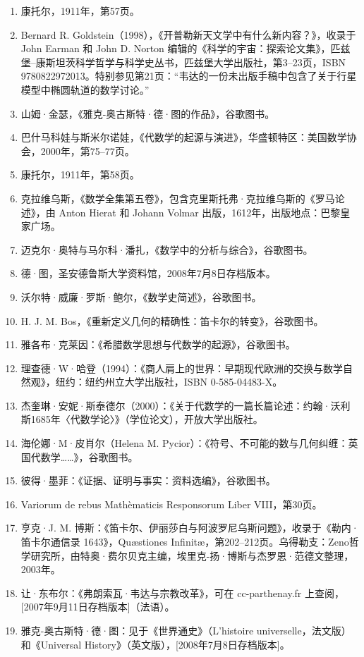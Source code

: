 \begin{enumerate}
\item 康托尔，1911年，第57页。
\item Bernard R. Goldstein（1998），《开普勒新天文学中有什么新内容？》，收录于 John Earman 和 John D. Norton 编辑的《科学的宇宙：探索论文集》，匹兹堡–康斯坦茨科学哲学与科学史丛书，匹兹堡大学出版社，第3–23页，ISBN 9780822972013。特别参见第21页：“韦达的一份未出版手稿中包含了关于行星模型中椭圆轨道的数学讨论。”
\item 山姆·金瑟，《雅克-奥古斯特·德·图的作品》，谷歌图书。
\item 巴什马科娃与斯米尔诺娃，《代数学的起源与演进》，华盛顿特区：美国数学协会，2000年，第75–77页。
\item 康托尔，1911年，第58页。
\item 克拉维乌斯，《数学全集第五卷》，包含克里斯托弗·克拉维乌斯的《罗马论述》，由 Anton Hierat 和 Johann Volmar 出版，1612年，出版地点：巴黎皇家广场。
\item 迈克尔·奥特与马尔科·潘扎，《数学中的分析与综合》，谷歌图书。
\item 德·图，圣安德鲁斯大学资料馆，2008年7月8日存档版本。
\item 沃尔特·威廉·罗斯·鲍尔，《数学史简述》，谷歌图书。
\item H. J. M. Bos，《重新定义几何的精确性：笛卡尔的转变》，谷歌图书。
\item 雅各布·克莱因：《希腊数学思想与代数学的起源》，谷歌图书。
\item 理查德·W·哈登（1994）：《商人肩上的世界：早期现代欧洲的交换与数学自然观》，纽约：纽约州立大学出版社，ISBN 0-585-04483-X。
\item 杰奎琳·安妮·斯泰德尔（2000）：《关于代数学的一篇长篇论述：约翰·沃利斯1685年〈代数学论〉》（学位论文），开放大学出版社。
\item 海伦娜·M·皮肖尔（Helena M. Pycior）：《符号、不可能的数与几何纠缠：英国代数学……》，谷歌图书。
\item 彼得·墨菲：《证据、证明与事实：资料选编》，谷歌图书。
\item Variorum de rebus Mathèmaticis Responsorum Liber VIII，第30页。
\item 亨克·J. M. 博斯：《笛卡尔、伊丽莎白与阿波罗尼乌斯问题》，收录于《勒内·笛卡尔通信录 1643》，Quæstiones Infinitæ，第202–212页。乌得勒支：Zeno哲学研究所，由特奥·费尔贝克主编，埃里克-扬·博斯与杰罗恩·范德文整理，2003年。
\item 让·东布尔：《弗朗索瓦·韦达与宗教改革》，可在 cc-parthenay.fr 上查阅，[2007年9月11日存档版本]（法语）。
\item 雅克-奥古斯特·德·图：见于《世界通史》（L'histoire universelle，法文版）和《Universal History》（英文版），[2008年7月8日存档版本]。

\end{enumerate}
